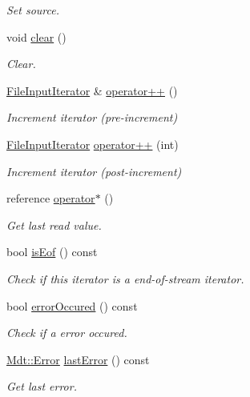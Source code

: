 \begin{DoxyCompactItemize}
\begin{DoxyCompactList}\small\item\em Set source. \end{DoxyCompactList}\item 
void \hyperlink{struct_mdt_1_1_plain_text_1_1_file_input_iterator_a4197ea452aa5e75602d1a38e08baef81}{clear} ()
\begin{DoxyCompactList}\small\item\em Clear. \end{DoxyCompactList}\item 
\hyperlink{struct_mdt_1_1_plain_text_1_1_file_input_iterator}{File\+Input\+Iterator} \& \hyperlink{struct_mdt_1_1_plain_text_1_1_file_input_iterator_a0048b29d504d922ab979c22063eae21a}{operator++} ()
\begin{DoxyCompactList}\small\item\em Increment iterator (pre-\/increment) \end{DoxyCompactList}\item 
\hyperlink{struct_mdt_1_1_plain_text_1_1_file_input_iterator}{File\+Input\+Iterator} \hyperlink{struct_mdt_1_1_plain_text_1_1_file_input_iterator_a28f4e511a266f8ffcd2a5844127050d7}{operator++} (int)
\begin{DoxyCompactList}\small\item\em Increment iterator (post-\/increment) \end{DoxyCompactList}\item 
reference \hyperlink{struct_mdt_1_1_plain_text_1_1_file_input_iterator_a5c3f8149a81d8f6f059fffe188f4110b}{operator$\ast$} ()
\begin{DoxyCompactList}\small\item\em Get last read value. \end{DoxyCompactList}\item 
bool \hyperlink{struct_mdt_1_1_plain_text_1_1_file_input_iterator_a5461a2af93730a77642d56333f952704}{is\+Eof} () const 
\begin{DoxyCompactList}\small\item\em Check if this iterator is a end-\/of-\/stream iterator. \end{DoxyCompactList}\item 
bool \hyperlink{struct_mdt_1_1_plain_text_1_1_file_input_iterator_afa93baaf36f16456fa29451fa4fcf9f3}{error\+Occured} () const 
\begin{DoxyCompactList}\small\item\em Check if a error occured. \end{DoxyCompactList}\item 
\hyperlink{class_mdt_1_1_error}{Mdt\+::\+Error} \hyperlink{struct_mdt_1_1_plain_text_1_1_file_input_iterator_a0d9ed2faf04b16e3a03fabd6a09db67e}{last\+Error} () const 
\begin{DoxyCompactList}\small\item\em Get last error. \end{DoxyCompactList}\end{DoxyCompactItemize}
